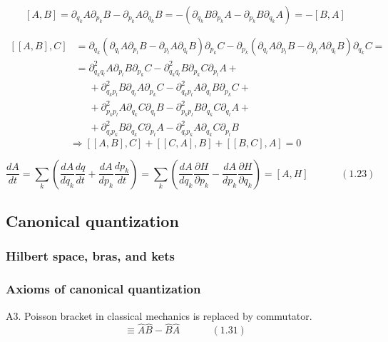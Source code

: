 \documentclass[twoside]{amsart}
\begin{document}
\[
[A,B] = \partial_{q_k} A \partial_{p_k} B - \partial_{p_k} A \partial_{q_k} B = - (\partial_{q_k} B \partial_{p_k} A - \partial_{p_k} B \partial_{q_k} A ) = - [B,A]
\]

\[
\begin{aligned}
  [[A,B],C] & = \partial_{q_k} ( \partial_{q_l} A \partial_{p_l} B - \partial_{p_l} A \partial_{q_l} B ) \partial_{p_k} C - \partial_{p_k} ( \partial_{q_l} A \partial_{p_l} B - \partial_{p_l} A \partial_{q_l} B ) \partial_{q_k} C =  \\ 
  & = \partial^2_{q_k q_l} A \partial_{p_l} B \partial_{p_k} C - \partial^2_{q_k q_l} B \partial_{p_k} C \partial_{p_l} A + \\
  & \phantom{ = } + \partial^2_{q_k p_l} B \partial_{q_l} A \partial_{p_k} C - \partial^2_{q_k p_l} A \partial_{q_l} B \partial_{p_k} C + \\
  & \phantom{ = } + \partial^2_{p_k p_l} A \partial_{q_k} C \partial_{q_l} B - \partial^2_{p_k p_l } B \partial_{q_k} C \partial_{q_l} A + \\ 
  & \phantom{ = } + \partial^2_{q_l p_k} B \partial_{q_k} C \partial_{p_l}A - \partial^2_{q_l p_k} A \partial_{q_k} C \partial_{p_l} B
\end{aligned}
\]
\[
\Longrightarrow [[A,B], C ] + [[C,A], B] + [[B,C], A] = 0
\]

\begin{equation}
  \frac{dA}{dt} = \sum_k \left( \frac{ dA}{ dq_k } \frac{ dq}{ dt} + \frac{dA}{ dp_k } \frac{dp_k}{dt} \right) = \sum_k \left( \frac{dA}{ dq_k} \frac{ \partial H}{ \partial p_k} - \frac{ dA}{ d p_k} \frac{ \partial H}{ \partial q_k} \right) = [A,H] \quad \quad \quad \, (1.23)
\end{equation}


\subsection{ Canonical quantization }
\subsubsection{Hilbert space, bras, and kets}
\subsubsection{Axioms of canonical quantization}

A3. Poisson bracket in classical mechanics is replaced by commutator. 
\begin{equation}
  [ \widehat{A}, \widehat{B} ] \equiv \widehat{A} \widehat{B} - \widehat{B} \widehat{A} \quad \quad \quad \, (1.31)
\end{equation}
\end{document}
